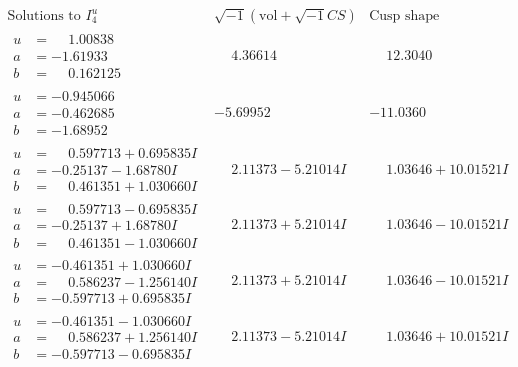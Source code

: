 \documentclass[1p]{elsarticle_modified}
\theoremstyle{definition}
\newcommand{\I}{\sqrt{-1}}
\begin{document}
$$\begin{array}{c|c|c}  
\text{Solutions to }I^u_{4}& \I (\text{vol} + \sqrt{-1}CS) & \text{Cusp shape}\\
 \hline 
\begin{aligned}
u &= \phantom{-}1.00838\phantom{ +0.000000I} \\
a &= -1.61933\phantom{ +0.000000I} \\
b &= \phantom{-}0.162125\phantom{ +0.000000I}\end{aligned}
 & \phantom{-}4.36614\phantom{ +0.000000I} & \phantom{-}12.3040\phantom{ +0.000000I} \\ \hline\begin{aligned}
u &= -0.945066\phantom{ +0.000000I} \\
a &= -0.462685\phantom{ +0.000000I} \\
b &= -1.68952\phantom{ +0.000000I}\end{aligned}
 & -5.69952\phantom{ +0.000000I} & -11.0360\phantom{ +0.000000I} \\ \hline\begin{aligned}
u &= \phantom{-}0.597713 + 0.695835 I \\
a &= -0.25137 - 1.68780 I \\
b &= \phantom{-}0.461351 + 1.030660 I\end{aligned}
 & \phantom{-}2.11373 - 5.21014 I & \phantom{-}1.03646 + 10.01521 I \\ \hline\begin{aligned}
u &= \phantom{-}0.597713 - 0.695835 I \\
a &= -0.25137 + 1.68780 I \\
b &= \phantom{-}0.461351 - 1.030660 I\end{aligned}
 & \phantom{-}2.11373 + 5.21014 I & \phantom{-}1.03646 - 10.01521 I \\ \hline\begin{aligned}
u &= -0.461351 + 1.030660 I \\
a &= \phantom{-}0.586237 - 1.256140 I \\
b &= -0.597713 + 0.695835 I\end{aligned}
 & \phantom{-}2.11373 + 5.21014 I & \phantom{-}1.03646 - 10.01521 I \\ \hline\begin{aligned}
u &= -0.461351 - 1.030660 I \\
a &= \phantom{-}0.586237 + 1.256140 I \\
b &= -0.597713 - 0.695835 I\end{aligned}
 & \phantom{-}2.11373 - 5.21014 I & \phantom{-}1.03646 + 10.01521 I \\ \hline\begin{aligned}

\end{aligned}
\end{array}$$
\end{document}
